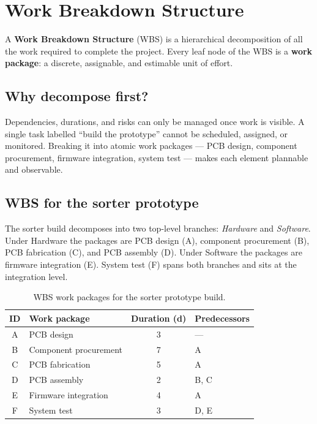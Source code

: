 \section{Work Breakdown Structure}
\label{sec:wbs}

A \textbf{Work Breakdown Structure}
(WBS) is a hierarchical decomposition of all the work required to
complete the project.
Every leaf node of the WBS is a \textbf{work package}:
a discrete, assignable, and estimable unit of effort.

\subsection{Why decompose first?}

Dependencies, durations, and risks can only be managed once work is
visible.
A single task labelled ``build the prototype'' cannot be scheduled,
assigned, or monitored.
Breaking it into atomic work packages — PCB design, component
procurement, firmware integration, system test — makes each element
plannable and observable.

\subsection{WBS for the sorter prototype}

The sorter build decomposes into two top-level branches: \emph{Hardware}
and \emph{Software}.
Under Hardware the packages are PCB design (A), component procurement
(B), PCB fabrication (C), and PCB assembly (D).
Under Software the packages are firmware integration (E).
System test (F) spans both branches and sits at the integration level.

\begin{table}[h]
  \centering
  \caption{WBS work packages for the sorter prototype build.}
  \label{tab:wbs}
  \begin{tabular}{clcl}
    \hline
    \textbf{ID} & \textbf{Work package} & \textbf{Duration (d)} &
    \textbf{Predecessors} \\
    \hline
    A & PCB design           & 3 & --- \\
    B & Component procurement & 7 & A   \\
    C & PCB fabrication      & 5 & A   \\
    D & PCB assembly         & 2 & B, C \\
    E & Firmware integration & 4 & A   \\
    F & System test          & 3 & D, E \\
    \hline
  \end{tabular}
\end{table}

